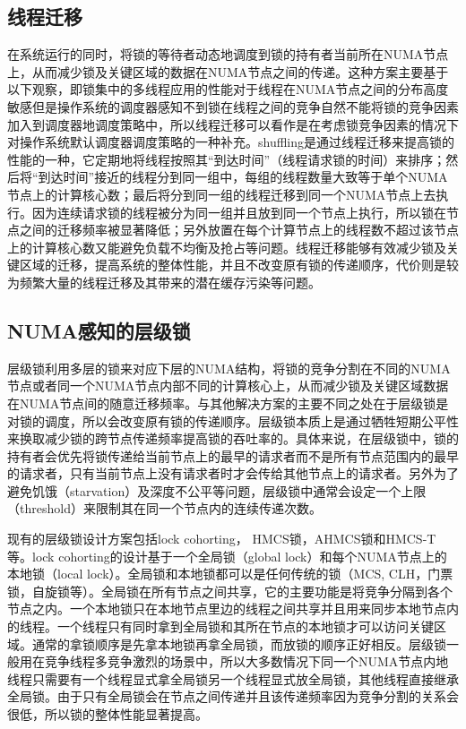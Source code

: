 \subsection{线程迁移}
在系统运行的同时，将锁的等待者动态地调度到锁的持有者当前所在NUMA节点上，从而减少锁及关键区域的数据在NUMA节点之间的传递\cite{sridharan2006thread}\cite{thekkath1994impact}。这种方案主要基于以下观察，即锁集中的多线程应用的性能对于线程在NUMA节点之间的分布高度敏感但是操作系统的调度器感知不到锁在线程之间的竞争自然不能将锁的竞争因素加入到调度器地调度策略中，所以线程迁移可以看作是在考虑锁竞争因素的情况下对操作系统默认调度器调度策略的一种补充。shuffling\cite{pusukuri2014shuffling}是通过线程迁移来提高锁的性能的一种，它定期地将线程按照其“到达时间”（线程请求锁的时间）来排序；然后将“到达时间”接近的线程分到同一组中，每组的线程数量大致等于单个NUMA节点上的计算核心数；最后将分到同一组的线程迁移到同一个NUMA节点上去执行。因为连续请求锁的线程被分为同一组并且放到同一个节点上执行，所以锁在节点之间的迁移频率被显著降低；另外放置在每个计算节点上的线程数不超过该节点上的计算核心数又能避免负载不均衡及抢占等问题。线程迁移能够有效减少锁及关键区域的迁移，提高系统的整体性能，并且不改变原有锁的传递顺序，代价则是较为频繁大量的线程迁移及其带来的潜在缓存污染等问题。

\subsection{NUMA感知的层级锁}
层级锁利用多层的锁来对应下层的NUMA结构，将锁的竞争分割在不同的NUMA节点或者同一个NUMA节点内部不同的计算核心上，从而减少锁及关键区域数据在NUMA节点间的随意迁移频率\cite{dice2012lock}。与其他解决方案的主要不同之处在于层级锁是对锁的调度，所以会改变原有锁的传递顺序。层级锁本质上是通过牺牲短期公平性来换取减少锁的跨节点传递频率提高锁的吞吐率的。具体来说，在层级锁中，锁的持有者会优先将锁传递给当前节点上的最早的请求者而不是所有节点范围内的最早的请求者，只有当前节点上没有请求者时才会传给其他节点上的请求者。另外为了避免饥饿（starvation）及深度不公平等问题，层级锁中通常会设定一个上限（threshold）来限制其在同一个节点内的连续传递次数。

现有的层级锁设计方案包括lock cohorting\cite{dice2012lock}， HMCS锁\cite{chabbi2015high}，AHMCS锁\cite{chabbi2016contention}和HMCS-T\cite{chabbi2017efficient}等。lock cohorting的设计基于一个全局锁（global lock）和每个NUMA节点上的本地锁（local lock）。全局锁和本地锁都可以是任何传统的锁（MCS, CLH，门票锁，自旋锁等）。全局锁在所有节点之间共享，它的主要功能是将竞争分隔到各个节点之内。一个本地锁只在本地节点里边的线程之间共享并且用来同步本地节点内的线程。一个线程只有同时拿到全局锁和其所在节点的本地锁才可以访问关键区域。通常的拿锁顺序是先拿本地锁再拿全局锁，而放锁的顺序正好相反。层级锁一般用在竞争线程多竞争激烈的场景中，所以大多数情况下同一个NUMA节点内地线程只需要有一个线程显式拿全局锁另一个线程显式放全局锁，其他线程直接继承全局锁。由于只有全局锁会在节点之间传递并且该传递频率因为竞争分割的关系会很低，所以锁的整体性能显著提高。

